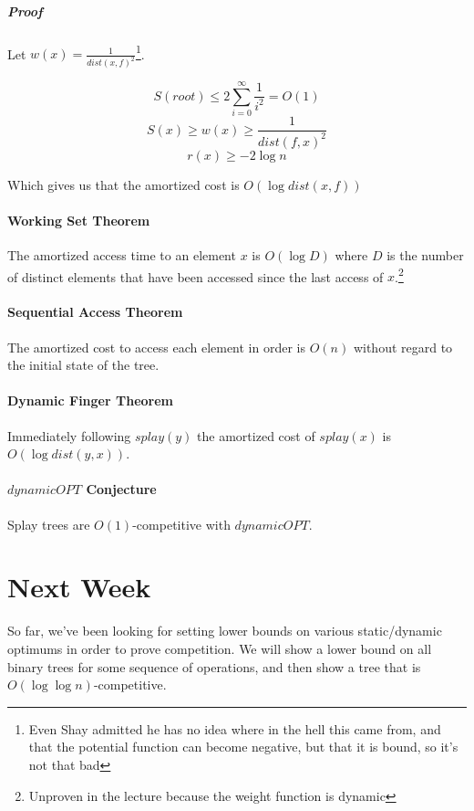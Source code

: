 \documentclass[a4paper]{article}
\begin{document}
\subparagraph{Proof}
Let $w(x)=\frac{1}{dist(x,f)^2}$\footnote{Even Shay admitted he has no idea where in the hell this came from, and that the potential function can become negative, but that it is bound, so it's not that bad}.

\[S(root) \le 2 \sum_{i=0}^{\infty} \frac{1}{i^2}=O(1)\]
\[S(x) \ge w(x) \ge \frac{1}{dist(f,x)^2}\]
\[r(x) \ge -2 \log n\]

Which gives us that the amortized cost is $O(\log dist(x,f))$

\paragraph{Working Set Theorem}
The amortized access time to an element $x$ is $O(\log D)$ where $D$ is the number of distinct elements that have been accessed since the last access of $x$.\footnote{Unproven in the lecture because the weight function is dynamic}

\paragraph{Sequential Access Theorem}
The amortized cost to access each element in order is $O(n)$ without regard to the initial state of the tree.

\paragraph{Dynamic Finger Theorem}
Immediately following $splay(y)$ the amortized cost of $splay(x)$ is $O(\log dist(y,x))$.

\paragraph{$dynamicOPT$ Conjecture}
Splay trees are $O(1)$-competitive with $dynamicOPT$.

\section{Next Week}
So far, we've been looking for setting lower bounds on various static/dynamic optimums in order to prove competition. We will show a lower bound on all binary trees for some sequence of operations, and then show a tree that is $O(\log\log n)$-competitive.
\end{document}
